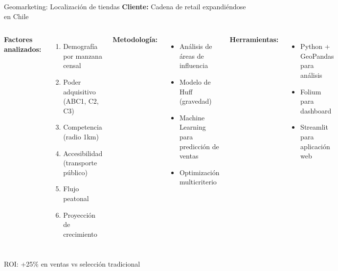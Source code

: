 \documentclass[10pt]{beamer}
\begin{document}
\begin{frame}{Geomarketing: Localización de tiendas}
    \textbf{Cliente:} Cadena de retail expandiéndose en Chile
    
    \begin{columns}
        \textbf{Factores analizados:}
        \begin{enumerate}
            \item Demografía por manzana censal
            \item Poder adquisitivo (ABC1, C2, C3)
            \item Competencia (radio 1km)
            \item Accesibilidad (transporte público)
            \item Flujo peatonal
            \item Proyección de crecimiento
        \end{enumerate}
        
        \textbf{Metodología:}
        \begin{itemize}
            \item Análisis de áreas de influencia
            \item Modelo de Huff (gravedad)
            \item Machine Learning para predicción de ventas
            \item Optimización multicriterio
        \end{itemize}
        
        \vspace{0.3cm}
        \textbf{Herramientas:}
        \begin{itemize}
            \item Python + GeoPandas para análisis
            \item Folium para dashboard
            \item Streamlit para aplicación web
        \end{itemize}
    \end{columns}
    
    \vspace{0.3cm}
    \begin{center}
        \textcolor{usachred}{ ROI: +25\% en ventas vs selección tradicional}
    \end{center}
\end{frame}
\end{document}
